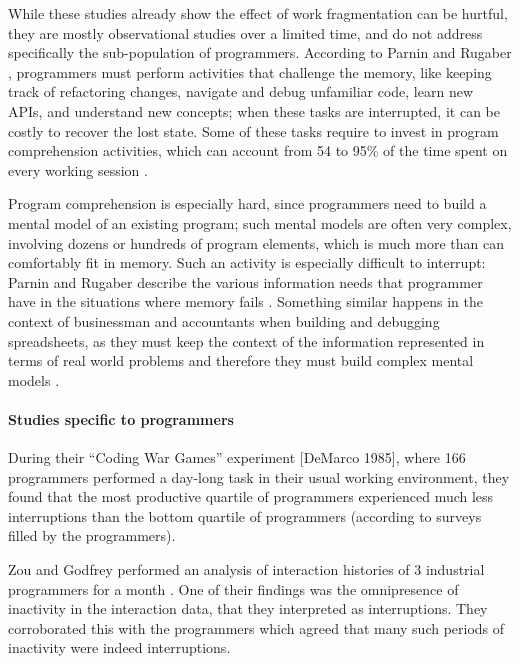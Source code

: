 \documentclass[times]{smrauth}
\newcommand\RR[1]{\textbf{Romain #1}}
\begin{document}
While these studies already show the effect of work fragmentation can be hurtful, they are mostly observational studies over a limited time, and do not address specifically the sub-population of programmers. According to Parnin and Rugaber \cite{PR12}, programmers must perform activities that challenge the memory, like keeping track of refactoring changes, navigate and debug unfamiliar code, learn new APIs, and understand new concepts; when these tasks are interrupted, it can be costly to recover the lost state. Some of these tasks require to invest in program comprehension activities, which can account from 54 to 95\% of the time spent on every working session \cite{MMLK14}. 

Program comprehension is especially hard, since programmers need to build a mental model of an existing program; such mental models are often very complex, involving dozens or hundreds of program elements, which is much more than can comfortably fit in memory. Such an activity is especially difficult to interrupt: Parnin and Rugaber describe the various information needs that programmer have in the situations where memory fails \cite{PR12}. Something similar happens in the context of businessman and accountants when building and debugging spreadsheets, as they must keep the context of the information represented in terms of real world problems and therefore they must build complex mental models \cite{KS13}.





\paragraph{Studies specific to programmers}


During their “Coding War Games” experiment [DeMarco 1985], where 166 programmers performed a day-long task in their usual working environment, they found that the most productive quartile of programmers experienced much less interruptions than the bottom quartile of programmers (according to surveys filled by the programmers).

Zou and Godfrey performed an analysis of interaction histories of 3 industrial programmers for a month \cite{ZG06}. One of their findings was the omnipresence of inactivity in the interaction data, that they interpreted as interruptions. They corroborated this with the programmers which agreed that many such periods of inactivity were indeed interruptions.
\end{document}
